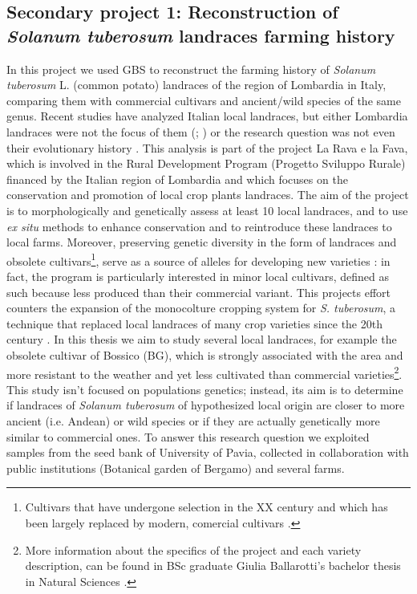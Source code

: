 \documentclass[a4paper, 12pt]{report}
\begin{document}
\subsection{Secondary project 1: Reconstruction of \textit{Solanum tuberosum} landraces farming history} 
In this project we used GBS to reconstruct the farming history of \textit{Solanum tuberosum} L. (common potato) landraces of the region of Lombardia in Italy, comparing them with commercial cultivars and ancient/wild species of the same genus. Recent studies have analyzed Italian local landraces, but either Lombardia landraces were not the focus of them (\cite{martinaConservationValorizationItalian2025}; \cite{parriExploringHeatStress2025}) or the research question was not even their evolutionary history \parencite{parriExploringHeatStress2025}. This analysis is part of the project La Rava e la Fava, which is involved in the Rural Development Program (Progetto Sviluppo Rurale) financed by the Italian region of Lombardia and which focuses on the conservation and promotion of local crop plants landraces. The aim of the project is to morphologically and genetically assess at least 10 local landraces, and to use \textit{ex situ} methods to enhance conservation and to reintroduce these landraces to local farms. Moreover, preserving genetic diversity in the form of landraces and obsolete cultivars\footnote{Cultivars that have undergone selection in the XX century and which has been largely replaced by modern, comercial cultivars \parencite{veginiPatateTradizionaliLocali2022}.}, serve as a source of alleles for developing new varieties \parencite{reddyReviewPotatoSolanum2018}: in fact, the program is particularly interested in minor local cultivars, defined as such because less produced than their commercial variant. This projects effort counters the expansion of the monocolture cropping system for \textit{S. tuberosum}, a technique that replaced local landraces of many crop varieties since the 20th century \parencite{salgotraGeneticDiversityConservation2023}. In this thesis we aim to study several local landraces, for example the obsolete cultivar \parencite{veginiPatateTradizionaliLocali2022} of Bossico (BG), which is strongly associated with the area and more resistant to the weather and yet less cultivated than commercial varieties\footnote{More information about the specifics of the project and each variety description, can be found in BSc graduate Giulia Ballarotti's bachelor thesis in Natural Sciences \parencite{ballarottiSolanumTuberosumNel2025}.}. This study isn't focused on populations genetics; instead, its aim is to determine if landraces of \textit{Solanum tuberosum} of hypothesized local origin are closer to more ancient (i.e. Andean) or wild species or if they are actually genetically more similar to commercial ones. To answer this research question we exploited samples from the seed bank of University of Pavia, collected in collaboration with public institutions (Botanical garden of Bergamo) and several farms. 
\end{document}
